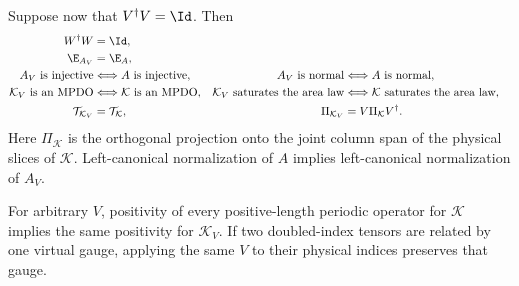\begin{lemma}
    Suppose now that $V^\dagger V=\Id$. Then
    \begin{align}
        W^\dagger W               & =\Id,
        \label{eq:mpdo_embedding_w_isometry}                                                                                      \\
        \E_{A_V}                  & =\E_A,
        \label{eq:mpdo_embedding_transfer}                                                                                        \\
        A_V\text{ is injective}
                                  & \Longleftrightarrow A\text{ is injective},
                                  & A_V\text{ is normal}
                                  & \Longleftrightarrow A\text{ is normal},
        \notag                                                                                                                    \\
        \mathcal K_V\text{ is an MPDO}
                                  & \Longleftrightarrow \mathcal K\text{ is an MPDO},
                                  & \mathcal K_V\text{ saturates the area law}
                                  & \Longleftrightarrow \mathcal K\text{ saturates the area law},
        \notag                                                                                                                    \\
        \mathcal T_{\mathcal K_V} & =\mathcal T_{\mathcal K},
                                  & \Pi_{\mathcal K_V}                                            & =V \Pi_{\mathcal K}V^\dagger.
        \label{eq:mpdo_embedding_trace_support}
    \end{align}
    Here $\Pi_{\mathcal K}$ is the orthogonal projection onto the joint column
    span of the physical slices of $\mathcal K$.  Left-canonical normalization
    of $A$ implies left-canonical normalization of $A_V$.

    For arbitrary $V$, positivity of every positive-length periodic operator
    for $\mathcal K$ implies the same positivity for $\mathcal K_V$.
    If two doubled-index tensors are related by one virtual gauge,
    applying the same $V$ to their physical indices preserves that gauge.
\end{lemma}

